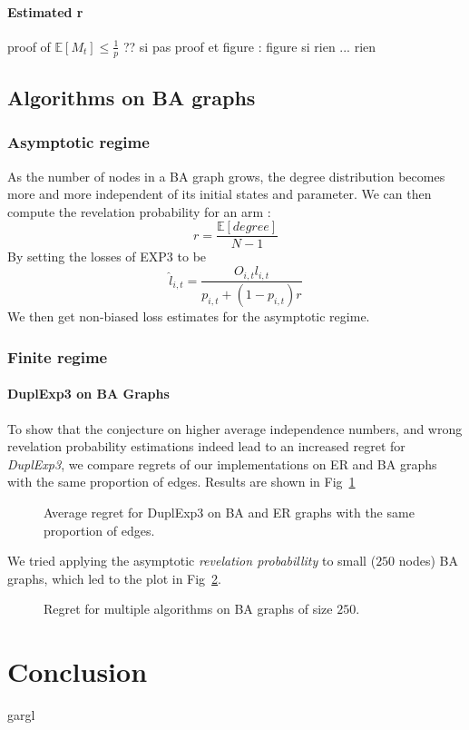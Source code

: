 \documentclass[10pt,a4paper]{scrartcl}
\providecommand{\E}{\mathbb{E}}
\begin{document}
\paragraph{Estimated r}
proof of $\E[M_t] \leq \frac{1}{p}$ ??
si pas proof et figure : figure
si rien ... rien


\subsection{Algorithms on BA graphs}
\subsubsection{Asymptotic regime}
As the number of nodes in a BA graph grows, the degree distribution becomes more and more independent of its initial states and parameter. We can then compute the revelation probability for an arm :
$$r = \frac{\E[degree]}{N-1}$$
By setting the losses of EXP3 to be 
$$\hat{l}_{i,t} = \frac{O_{i,t}l_{i,t}}{p_{i,t}+(1-p_{i,t})r}$$
We then get non-biased loss estimates for the asymptotic regime.


\subsubsection{Finite regime}
\paragraph{DuplExp3 on BA Graphs}
To show that the conjecture on higher average independence numbers, and wrong revelation probability estimations indeed lead to an increased regret for \emph{DuplExp3}, we compare regrets of our implementations on ER and BA graphs with the same proportion of edges. Results are shown in Fig~\ref{dupl_er_ba}

\begin{figure}[h!]
 \caption{Average regret for DuplExp3 on BA and ER graphs with the same proportion of edges.}
 \label{dupl_er_ba}
\end{figure}

We tried applying the asymptotic \emph{revelation probabillity} to small ($250$ nodes) BA graphs, which led to the plot in Fig~\ref{dupl_ba_finite_ba}.

\begin{figure}[h!]
 \caption{Regret for multiple algorithms on BA graphs of size $250$.}
 \label{dupl_ba_finite_ba}
\end{figure}


\section{Conclusion}
gargl



\end{document}
